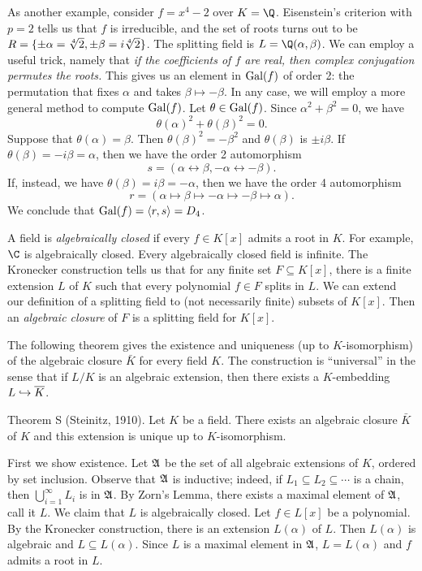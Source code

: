As another example, consider $f = x^4 - 2$ over $K = \Q$. Eisenstein's criterion with $p=2$ tells us that $f$ is irreducible, and the set of roots turns out to be $R = \{\pm \alpha = \root 4 \of 2, \pm \beta = i \root 4 \of 2\}$. The splitting field is $L = \Q(\alpha, \beta)$. We can employ a useful trick, namely that {\sl if the coefficients of $f$ are real, then complex conjugation permutes the roots.} This gives us an element in $\mathop {\rm Gal}(f)$ of order 2: the permutation that fixes $\alpha$ and takes $\beta\mapsto -\beta$. In any case, we will employ a more general method to compute $\mathop {\rm Gal}(f)$. Let $\theta\in \mathop {\rm Gal}(f)$. Since $\alpha^2 + \beta^2 = 0$, we have
$$\theta(\alpha)^2 + \theta(\beta)^2 = 0.$$
Suppose that $\theta(\alpha) = \beta$. Then $\theta(\beta)^2 = -\beta^2$ and $\theta(\beta)$ is $\pm i\beta$. If $\theta(\beta) = -i\beta = \alpha$, then we have the order 2 automorphism
$$s = (\alpha \leftrightarrow \beta, -\alpha\leftrightarrow-\beta).$$
If, instead, we have $\theta(\beta) = i\beta = -\alpha$, then we have the order 4 automorphism
$$r = (\alpha \mapsto \beta \mapsto -\alpha \mapsto -\beta \mapsto \alpha).$$
We conclude that $\mathop {\rm Gal}(f) = \langle r,s \rangle = D_4$.

A field is {\it algebraically closed} if every $f\in K[x]$ admits a root in $K$. For example, $\C$ is algebraically closed. Every algebraically closed field is infinite. The Kronecker construction tells us that for any finite set $F\subseteq K[x]$, there is a finite extension $L$ of $K$ such that every polynomial $f\in F$ splits in $L$. We can extend our definition of a splitting field to (not necessarily finite) subsets of $K[x]$. Then an {\it algebraic closure} of $F$ is a splitting field for $K[x]$.

The following theorem gives the existence and uniqueness (up to $K$-isomorphism) of the algebraic closure $\bar K$ for every field $K$. The construction is ``universal'' in the sense that if $L/K$ is an algebraic extension, then there exists a $K$-embedding $L\hookrightarrow \overline K$.

\parenproclaim Theorem S (Steinitz{\rm, 1910}). Let $K$ be a field. There exists an algebraic closure $\bar K$ of $K$ and this extension is unique up to $K$-isomorphism.

\proof First we show existence. Let $\frak A$ be the set of all algebraic extensions of $K$, ordered by set inclusion. Observe that $\frak A$ is inductive; indeed, if $L_1\subseteq L_2\subseteq \cdots$ is a chain, then $\bigcup_{i=1}^\infty L_i$ is in $\frak A$. By Zorn's Lemma, there exists a maximal element of $\frak A$, call it $L$. We claim that $L$ is algebraically closed. Let $f\in L[x]$ be a polynomial. By the Kronecker construction, there is an extension $L(\alpha)$ of $L$. Then $L(\alpha)$ is algebraic and $L\subseteq L(\alpha)$. Since $L$ is a maximal element in $\frak A$, $L = L(\alpha)$ and $f$ admits a root in $L$.

